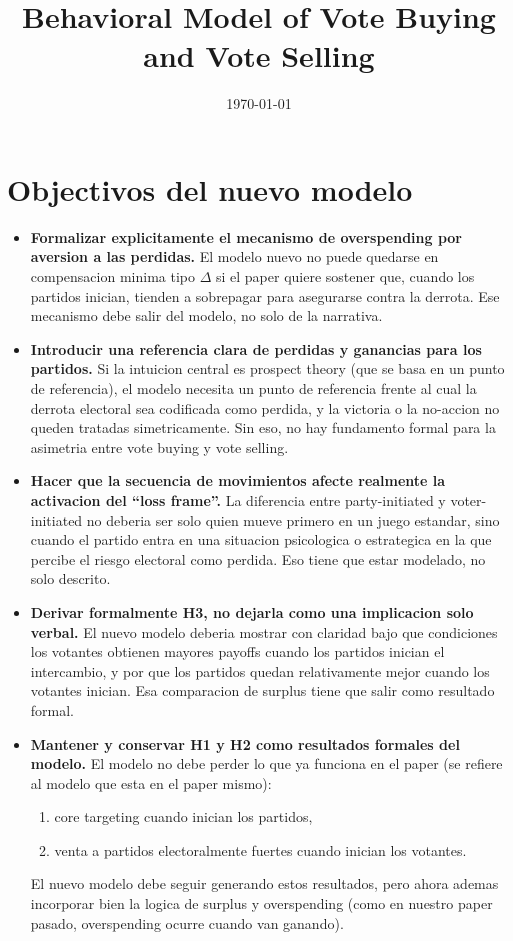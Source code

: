 \documentclass[11pt]{article}
\title{Behavioral Model of Vote Buying and Vote Selling}
\date{\today}
\begin{document}
\maketitle

\section{Objectivos del nuevo modelo}

\begin{itemize}

\item \textbf{Formalizar explicitamente el mecanismo de overspending por aversion a las perdidas.}  
El modelo nuevo no puede quedarse en compensacion minima tipo $\Delta$ si el paper quiere sostener que, cuando los partidos inician, tienden a sobrepagar para asegurarse contra la derrota. Ese mecanismo debe salir del modelo, no solo de la narrativa.

\item \textbf{Introducir una referencia clara de perdidas y ganancias para los partidos.}  
Si la intuicion central es prospect theory (que se basa en un punto de referencia), el modelo necesita un punto de referencia frente al cual la derrota electoral sea codificada como perdida, y la victoria o la no-accion no queden tratadas simetricamente. Sin eso, no hay fundamento formal para la asimetria entre vote buying y vote selling.

\item \textbf{Hacer que la secuencia de movimientos afecte realmente la activacion del ``loss frame''.}  
La diferencia entre party-initiated y voter-initiated no deberia ser solo quien mueve primero en un juego estandar, sino cuando el partido entra en una situacion psicologica o estrategica en la que percibe el riesgo electoral como perdida. Eso tiene que estar modelado, no solo descrito.

\item \textbf{Derivar formalmente H3, no dejarla como una implicacion solo verbal.}  
El nuevo modelo deberia mostrar con claridad bajo que condiciones los votantes obtienen mayores payoffs cuando los partidos inician el intercambio, y por que los partidos quedan relativamente mejor cuando los votantes inician. Esa comparacion de surplus tiene que salir como resultado formal.

\item \textbf{Mantener y conservar H1 y H2 como resultados formales del modelo.}  
El modelo no debe perder lo que ya funciona en el paper (se refiere al modelo que esta en el paper mismo):
\begin{enumerate}
\item core targeting cuando inician los partidos,
\item venta a partidos electoralmente fuertes cuando inician los votantes.
\end{enumerate}
El nuevo modelo debe seguir generando estos resultados, pero ahora ademas incorporar bien la logica de surplus y overspending (como en nuestro paper pasado, overspending ocurre cuando van ganando).


\end{itemize}
\end{document}
